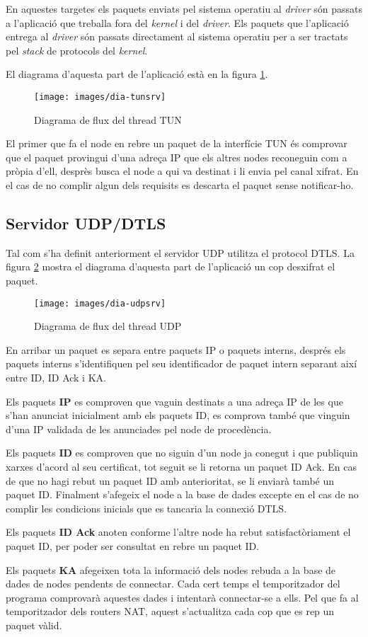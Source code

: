 En aquestes targetes els paquets enviats pel sistema operatiu al \emph{driver} són passats a l'aplicació que treballa fora del \emph{kernel} i del \emph{driver}. Els paquets que l'aplicació entrega al \emph{driver} són passats directament al sistema operatiu per a ser tractats pel \emph{stack} de protocols del \emph{kernel}.

El diagrama d'aquesta part de l'aplicació està en la figura \ref{F:dia-tunsrv}.
\begin{figure}[htb]
\centering
\texttt{[image: images/dia-tunsrv]}
\caption{Diagrama de flux del thread TUN}
\label{F:dia-tunsrv}
\end{figure}
El primer que fa el node en rebre un paquet de la interfície TUN és comprovar que el paquet provingui d'una adreça IP que els altres nodes reconeguin com a pròpia d'ell, desprès busca el node a qui va destinat i li envia pel canal xifrat. En el cas de no complir algun dels requisits es descarta el paquet sense notificar-ho.

\subsection{Servidor UDP/DTLS}
Tal com s'ha definit anteriorment el servidor UDP utilitza el protocol DTLS. La figura \ref{F:dia-udpsrv} mostra el diagrama d'aquesta part de l'aplicació un cop desxifrat el paquet.
\begin{figure}[htb]
\centering
\texttt{[image: images/dia-udpsrv]}
\caption{Diagrama de flux del thread UDP}
\label{F:dia-udpsrv}
\end{figure}
En arribar un paquet es separa entre paquets IP o paquets interns, després els paquets interns s'identifiquen pel seu identificador de paquet intern separant així entre ID, ID Ack i KA.

Els paquets \textbf{IP} es comproven que vaguin destinats a una adreça IP de les que s'han anunciat inicialment amb els paquets ID, es comprova també que vinguin d'una IP validada de les anunciades pel node de procedència. 

Els paquets \textbf{ID} es comproven que no siguin d'un node ja conegut i que publiquin xarxes d'acord al seu certificat, tot seguit se li retorna un paquet ID Ack. En cas de que no hagi rebut un paquet ID amb anterioritat, se li enviarà també un paquet ID. Finalment s'afegeix el node a la base de dades excepte en el cas de no complir les condicions inicials que es tancaria la connexió DTLS.

Els paquets \textbf{ID Ack} anoten conforme l'altre node ha rebut satisfactòriament el paquet ID, per poder ser consultat en rebre un paquet ID.

Els paquets \textbf{KA} afegeixen tota la informació dels nodes rebuda a la base de dades de nodes pendents de connectar. Cada cert temps el temporitzador del programa comprovarà aquestes dades i intentarà connectar-se a ells. Pel que fa al temporitzador dels routers NAT, aquest s'actualitza cada cop que es rep un paquet vàlid.

